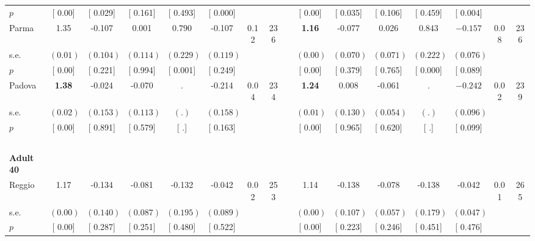 \begin{longtable}{L{8em} c c c c c c c p{1em} c c c c c c c}
\quad \quad \quad \quad $ p$ & [     0.00] & [    0.029] & [    0.161] & [    0.493] & [    0.000] & & & & [     0.00] & [    0.035] & [    0.106] & [    0.459] & [    0.004] & &  \\[1em]
\quad \quad \quad Parma& 1.35 &    -0.107 &     0.001 & $ \mathbf{    0.790}$ &    -0.107 &      0.12 &       236 & & \textbf{     1.16} &    -0.077 &     0.026 & $ \mathbf{    0.843}$ & $ \mathbf{   -0.157}$ &      0.08 &       236  \\*
\quad \quad \quad \quad s.e.& $ (     0.01)$ & $ (    0.104)$ & $ (    0.114)$ & $ (    0.229)$ & $ (    0.119)$ & & & & $ (     0.00)$ & $ (    0.070)$ & $ (    0.071)$ & $ (    0.222)$ & $ (    0.076)$ & &  \\*
\quad \quad \quad \quad $ p$ & [     0.00] & [    0.221] & [    0.994] & [    0.001] & [    0.249] & & & & [     0.00] & [    0.379] & [    0.765] & [    0.000] & [    0.089] & &  \\[1em]
\quad \quad \quad Padova& \textbf{     1.38} &    -0.024 &    -0.070 &         . &    -0.214 &      0.04 &       234 & & \textbf{     1.24} &     0.008 &    -0.061 &         . & $ \mathbf{   -0.242}$ &      0.02 &       239  \\*
\quad \quad \quad \quad s.e.& $ (     0.02)$ & $ (    0.153)$ & $ (    0.113)$ & $ (        .)$ & $ (    0.158)$ & & & & $ (     0.01)$ & $ (    0.130)$ & $ (    0.054)$ & $ (        .)$ & $ (    0.096)$ & &  \\*
\quad \quad \quad \quad $ p$ & [     0.00] & [    0.891] & [    0.579] & [        .] & [    0.163] & & & & [     0.00] & [    0.965] & [    0.620] & [        .] & [    0.099] & &  \\[1em]
~\\[1em]
\quad \quad \textbf{Adult 40} & & & & & & & & & & & & & & & \\* 
\quad \quad \quad Reggio& 1.17 &    -0.134 &    -0.081 &    -0.132 &    -0.042 &      0.02 &       253 & & 1.14 &    -0.138 &    -0.078 &    -0.138 &    -0.042 &      0.01 &       265  \\*
\quad \quad \quad \quad s.e.& $ (     0.00)$ & $ (    0.140)$ & $ (    0.087)$ & $ (    0.195)$ & $ (    0.089)$ & & & & $ (     0.00)$ & $ (    0.107)$ & $ (    0.057)$ & $ (    0.179)$ & $ (    0.047)$ & &  \\*
\quad \quad \quad \quad $ p$ & [     0.00] & [    0.287] & [    0.251] & [    0.480] & [    0.522] & & & & [     0.00] & [    0.223] & [    0.246] & [    0.451] & [    0.476] & &  \\[1em]

\end{longtable}

